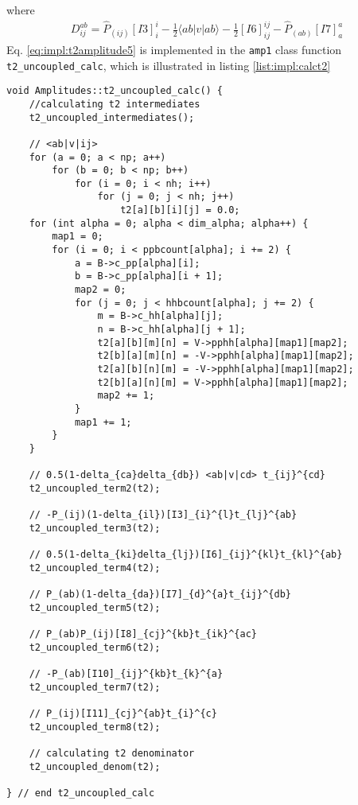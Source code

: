 where
\begin{align}
D_{ij}^{ab}=\hat{P}_{(ij)}[I3]_{i}^{i}-\frac{1}{2}\langle ab|v|ab\rangle-\frac{1}{2}[I6]_{ij}^{ij}-\hat{P}_{(ab)}[I7]_{a}^{a}
\label{eq:impl:t2denom}
\end{align}
Eq. \ref{eq:impl:t2amplitude5} is implemented in the \texttt{amp1} class function \texttt{t2\_uncoupled\_calc}, which is illustrated in listing \ref{list:impl:calct2}
%
\begin{lstlisting}[label={list:impl:calct2},caption={Implementation of the amp1 class function t2\_uncoupled\_calc()}]
void Amplitudes::t2_uncoupled_calc() {
    //calculating t2 intermediates
    t2_uncoupled_intermediates();

    // <ab|v|ij>
    for (a = 0; a < np; a++)
        for (b = 0; b < np; b++)
            for (i = 0; i < nh; i++)
                for (j = 0; j < nh; j++)
                    t2[a][b][i][j] = 0.0;
    for (int alpha = 0; alpha < dim_alpha; alpha++) {
        map1 = 0;
        for (i = 0; i < ppbcount[alpha]; i += 2) {
            a = B->c_pp[alpha][i];
            b = B->c_pp[alpha][i + 1];
            map2 = 0;
            for (j = 0; j < hhbcount[alpha]; j += 2) {
                m = B->c_hh[alpha][j];
                n = B->c_hh[alpha][j + 1];
                t2[a][b][m][n] = V->pphh[alpha][map1][map2];
                t2[b][a][m][n] = -V->pphh[alpha][map1][map2];
                t2[a][b][n][m] = -V->pphh[alpha][map1][map2];
                t2[b][a][n][m] = V->pphh[alpha][map1][map2];
                map2 += 1;
            }
            map1 += 1;
        }
    }

    // 0.5(1-delta_{ca}delta_{db}) <ab|v|cd> t_{ij}^{cd}
    t2_uncoupled_term2(t2);

    // -P_(ij)(1-delta_{il})[I3]_{i}^{l}t_{lj}^{ab}
    t2_uncoupled_term3(t2);

    // 0.5(1-delta_{ki}delta_{lj})[I6]_{ij}^{kl}t_{kl}^{ab}
    t2_uncoupled_term4(t2);

    // P_(ab)(1-delta_{da})[I7]_{d}^{a}t_{ij}^{db}
    t2_uncoupled_term5(t2);

    // P_(ab)P_(ij)[I8]_{cj}^{kb}t_{ik}^{ac}
    t2_uncoupled_term6(t2);

    // -P_(ab)[I10]_{ij}^{kb}t_{k}^{a}
    t2_uncoupled_term7(t2);

    // P_(ij)[I11]_{cj}^{ab}t_{i}^{c}
    t2_uncoupled_term8(t2);

    // calculating t2 denominator
    t2_uncoupled_denom(t2);

} // end t2_uncoupled_calc
\end{lstlisting}
